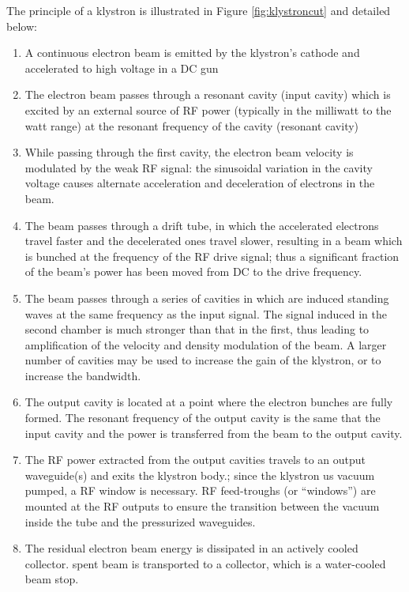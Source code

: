 The principle of a klystron is illustrated in Figure \ref{fig:klystroncut} \parencite{Tenenbaum2003} and detailed below:

\begin{enumerate}
 \item  A continuous electron beam is emitted by the klystron's cathode and accelerated to high voltage in a DC gun 
 \item The electron beam passes through a resonant cavity (input cavity) which is excited by an external source of RF power (typically in the milliwatt to the watt range) at the resonant frequency of the cavity (resonant cavity) 
\item While passing through the first cavity, the electron beam velocity is modulated by the weak RF signal: the sinusoidal variation in the cavity voltage causes alternate acceleration and deceleration of electrons in the beam. 
\item The beam passes through a drift tube, in which the accelerated electrons travel faster and the decelerated ones travel slower, resulting in a beam which is bunched at the frequency of the RF drive signal; thus a significant fraction of the beam’s power has been moved from DC to the drive frequency. 
\item The beam passes through a series of cavities in which are induced standing waves at the same frequency as the input signal. The signal induced in the second chamber is much stronger than that in the first, thus leading to amplification of the velocity and density modulation of the beam. A larger number of cavities may be used to increase the gain of the klystron, or to increase the bandwidth. 
\item The output cavity is located at a point where the electron bunches are fully formed. The resonant frequency of the output cavity is the same that the input cavity and the power is transferred from the beam to the output cavity. 
\item The RF power extracted from the output cavities travels to an output waveguide(s) and exits the klystron body.;  since the klystron us vacuum pumped, a RF window is necessary. RF feed-troughs (or “windows”) are mounted at the RF outputs to ensure the transition between the vacuum inside the tube and the pressurized waveguides.
\item The residual electron beam energy is dissipated in an actively cooled collector. spent beam is transported to a collector, which is a water-cooled beam stop. 
\end{enumerate}

